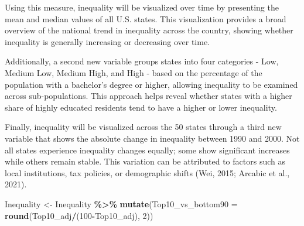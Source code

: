 \documentclass[
]{article}
\newenvironment{Shaded}{\begin{snugshade}}{\end{snugshade}}
\newcommand{\AttributeTok}[1]{\textcolor[rgb]{0.13,0.29,0.53}{#1}}
\newcommand{\DecValTok}[1]{\textcolor[rgb]{0.00,0.00,0.81}{#1}}
\newcommand{\FunctionTok}[1]{\textcolor[rgb]{0.13,0.29,0.53}{\textbf{#1}}}
\newcommand{\NormalTok}[1]{#1}
\newcommand{\OtherTok}[1]{\textcolor[rgb]{0.56,0.35,0.01}{#1}}
\newcommand{\SpecialCharTok}[1]{\textcolor[rgb]{0.81,0.36,0.00}{\textbf{#1}}}
\begin{document}
Using this measure, inequality will be visualized over time by
presenting the mean and median values of all U.S. states. This
visualization provides a broad overview of the national trend in
inequality across the country, showing whether inequality is generally
increasing or decreasing over time.

Additionally, a second new variable groups states into four categories -
Low, Medium Low, Medium High, and High - based on the percentage of the
population with a bachelor's degree or higher, allowing inequality to be
examined across sub-populations. This approach helps reveal whether
states with a higher share of highly educated residents tend to have a
higher or lower inequality.

Finally, inequality will be visualized across the 50 states through a
third new variable that shows the absolute change in inequality between
1990 and 2000. Not all states experience inequality changes equally;
some show significant increases while others remain stable. This
variation can be attributed to factors such as local institutions, tax
policies, or demographic shifts (Wei, 2015; Arcabic et al., 2021).

\begin{Shaded}
\begin{Highlighting}[]
\NormalTok{Inequality }\OtherTok{\textless{}{-}}\NormalTok{ Inequality }\SpecialCharTok{\%\textgreater{}\%}
  \FunctionTok{mutate}\NormalTok{(}\AttributeTok{Top10\_vs\_bottom90 =} \FunctionTok{round}\NormalTok{(Top10\_adj}\SpecialCharTok{/}\NormalTok{(}\DecValTok{100}\SpecialCharTok{{-}}\NormalTok{Top10\_adj), }\DecValTok{2}\NormalTok{))}
\end{Highlighting}
\end{Shaded}
\end{document}
